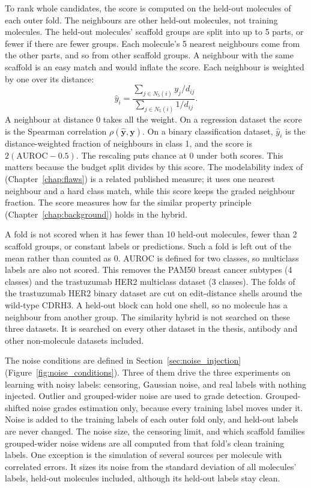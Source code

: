 To rank whole candidates, the score is computed on the held-out molecules of each outer fold. The neighbours are other held-out molecules, not training molecules. The held-out molecules' scaffold groups are split into up to 5 parts, or fewer if there are fewer groups. Each molecule's 5 nearest neighbours come from the other parts, and so from other scaffold groups. A neighbour with the same scaffold is an easy match and would inflate the score. Each neighbour is weighted by one over its distance:
$$
\hat{y}_i = \frac{\sum_{j\in N_5(i)} y_j / d_{ij}}{\sum_{j\in N_5(i)} 1/d_{ij}}.
$$
A neighbour at distance 0 takes all the weight. On a regression dataset the score is the Spearman correlation $\rho(\hat{\mathbf{y}}, \mathbf{y})$. On a binary classification dataset, $\hat{y}_i$ is the distance-weighted fraction of neighbours in class 1, and the score is $2(\mathrm{AUROC} - 0.5)$. The rescaling puts chance at 0 under both scores. This matters because the budget split divides by this score. The modelability index of \citet{Golbraikh2014} (Chapter~\ref{chap:flaws}) is a related published measure; it uses one nearest neighbour and a hard class match, while this score keeps the graded neighbour fraction. The score measures how far the similar property principle (Chapter~\ref{chap:background}) holds in the hybrid.

A fold is not scored when it has fewer than 10 held-out molecules, fewer than 2 scaffold groups, or constant labels or predictions. Such a fold is left out of the mean rather than counted as 0. AUROC is defined for two classes, so multiclass labels are also not scored. This removes the PAM50 breast cancer subtypes (4 classes) and the trastuzumab HER2 multiclass dataset (3 classes). The folds of the trastuzumab HER2 binary dataset are cut on edit-distance shells around the wild-type CDRH3. A held-out block can hold one shell, so no molecule has a neighbour from another group. The similarity hybrid is not searched on these three datasets. It is searched on every other dataset in the thesis, antibody and other non-molecule datasets included.

The noise conditions are defined in Section~\ref{sec:noise_injection} (Figure~\ref{fig:noise_conditions}). Three of them drive the three experiments on learning with noisy labels: censoring, Gaussian noise, and real labels with nothing injected. Outlier and grouped-wider noise are used to grade detection. Grouped-shifted noise grades estimation only, because every training label moves under it. Noise is added to the training labels of each outer fold only, and held-out labels are never changed. The noise size, the censoring limit, and which scaffold families grouped-wider noise widens are all computed from that fold's clean training labels.
One exception is the simulation of several sources per molecule with correlated errors. It sizes its noise from the standard deviation of all molecules' labels, held-out molecules included, although its held-out labels stay clean.

